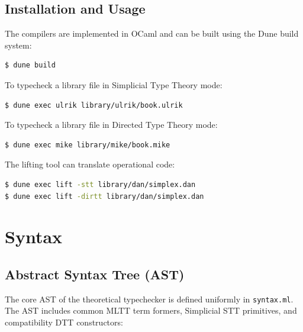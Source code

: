 \documentclass[11pt]{article}
\begin{document}
\subsection{Installation and Usage}

The compilers are implemented in OCaml and can be built using the Dune build system:
\begin{lstlisting}[language=bash]
$ dune build
\end{lstlisting}

To typecheck a library file in Simplicial Type Theory mode:
\begin{lstlisting}[language=bash]
$ dune exec ulrik library/ulrik/book.ulrik
\end{lstlisting}

To typecheck a library file in Directed Type Theory mode:
\begin{lstlisting}[language=bash]
$ dune exec mike library/mike/book.mike
\end{lstlisting}

The lifting tool can translate operational code:
\begin{lstlisting}[language=bash]
$ dune exec lift -stt library/dan/simplex.dan
$ dune exec lift -dirtt library/dan/simplex.dan
\end{lstlisting}

\newpage
\section{Syntax}

\subsection{Abstract Syntax Tree (AST)}

The core AST of the theoretical typechecker is defined uniformly in \texttt{syntax.ml}.
The AST includes common MLTT term formers, Simplicial STT primitives, and compatibility DTT constructors:
\end{document}
